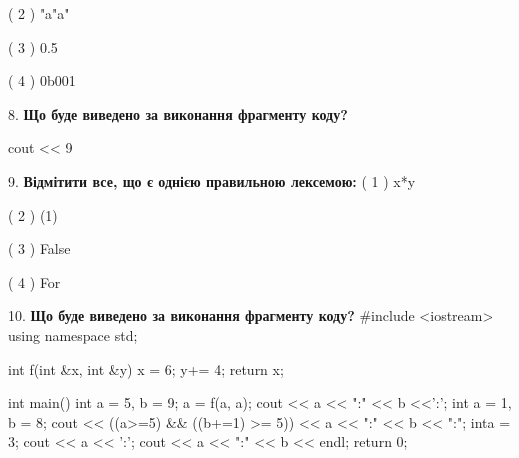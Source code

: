 \documentclass[11pt]{article}
\begin{document}
( 2 ) "a"a"

( 3 ) 0.5

( 4 ) 0b001
\vspace{5mm}

8. \textbf{Що буде виведено за виконання фрагменту коду?}

cout << 9 %
\vspace{5mm}

9. %
\textbf{Відмітити все, що є однією правильною лексемою:}
( 1 ) x*y

( 2 ) (1)

( 3 ) False

( 4 ) For
\vspace{5mm}

10. \textbf{Що буде виведено за виконання фрагменту коду?}
#include <iostream>
using namespace std;

int f(int &x, int &y){
    x = 6;
    y+= 4;
    return x;
}

int main(){
    int a = 5, b = 9;
    a = f(a, a);
    cout << a << ":" << b <<':';
    {
        int a = 1, b = 8;
        cout << ((a>=5) && ((b+=1) >= 5))
             << a << ":" << b << ":";
    }
    {
        inta = 3;
        cout << a << ':';
    }
    cout << a << ":" << b << endl;
    return 0;
}

\vspace{5mm}

\newpage
\end{document}
